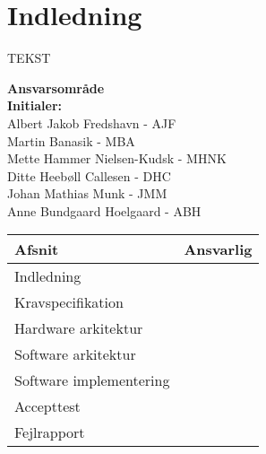 \chapter{Indledning}
TEKST

\textbf{Ansvarsområde} \\
\textbf{Initialer: } \\
Albert Jakob Fredshavn - AJF \\
Martin Banasik - MBA \\
Mette Hammer Nielsen-Kudsk - MHNK \\
Ditte Heebøll Callesen - DHC \\
Johan Mathias Munk - JMM \\
Anne Bundgaard Hoelgaard - ABH \\


\begin{longtabu} to 
    Afsnit &    Ansvarlig\\[-1ex]
    \midrule
    Indledning & \\
    Kravspecifikation & \\
    Hardware arkitektur & \\
    Software arkitektur & \\
    Software implementering & \\
    Accepttest & \\
    Fejlrapport & \\
    
    
    

\end{longtabu}